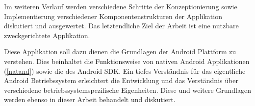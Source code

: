 Im weiteren Verlauf werden verschiedene Schritte der Konzeptionierung sowie Implementierung verschiedener Komponentenstrukturen der Applikation diskutiert und ausgewertet. Das letztendliche Ziel der Arbeit ist eine nutzbare zweckgerichtete Applikation.

Diese Applikation soll dazu dienen die Grundlagen der Android Plattform zu verstehen. Dies beinhaltet die Funktionsweise von nativen Android Applikationen (\ref{natand}) sowie die des Android SDK. Ein tiefes Verständnis für das eigentliche Android Betriebssystem erleichtert die Entwicklung und das Verständnis über verschiedene betriebssystemspezifische Eigenheiten. Diese und weitere Grundlagen werden ebenso in dieser Arbeit behandelt und diskutiert.